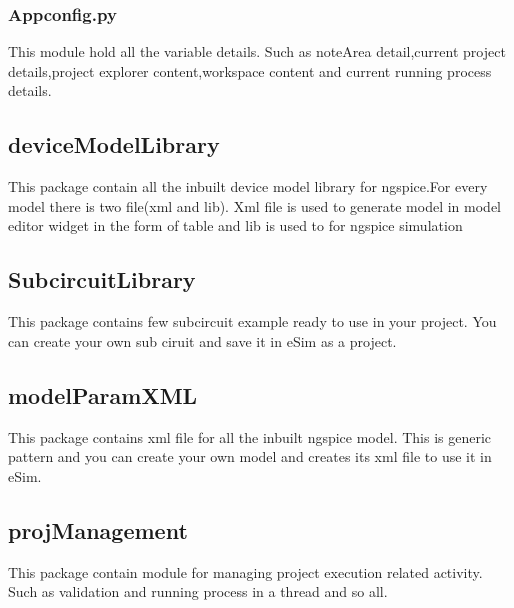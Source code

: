 \documentclass[12pt]{article}
\begin{document}
\subsubsection{Appconfig.py}
This module hold all the variable details. Such as noteArea detail,current project details,project explorer content,workspace content and current running process details.

\subsection{deviceModelLibrary}
This package contain all the inbuilt device model library for ngspice.For every model there is two file(xml and lib). Xml file is used to generate model in model editor widget in the form of table and lib is used to for ngspice simulation


\subsection{SubcircuitLibrary}
This package contains few subcircuit example ready to use in your project. You can create your own sub ciruit and save it in eSim as a project.

\subsection{modelParamXML}
This package contains xml file for all the inbuilt ngspice model. This is generic pattern and you can create your own model and creates its xml file to use it in eSim.

\subsection{projManagement}
This package contain module for managing project execution related activity. Such as validation and running process in a thread and so all.
\end{document}

